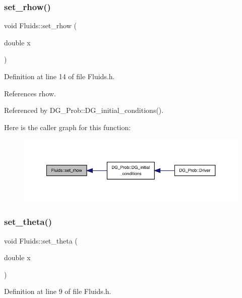 \subsubsection{\texorpdfstring{set\+\_\+rhow()}{set\_rhow()}}
{\footnotesize\ttfamily void Fluids\+::set\+\_\+rhow (\begin{DoxyParamCaption}\item[{double}]{x }\end{DoxyParamCaption})\hspace{0.3cm}{\ttfamily [inline]}}



Definition at line 14 of file Fluids.\+h.



References rhow.



Referenced by D\+G\+\_\+\+Prob\+::\+D\+G\+\_\+initial\+\_\+conditions().

Here is the caller graph for this function\+:
\nopagebreak
\begin{figure}[H]
\begin{center}
\leavevmode
\includegraphics[width=350pt]{classFluids_a5e905062ca17feb08fa1afc89efe042d_icgraph}
\end{center}
\end{figure}
\mbox{\label{classFluids_a7aa55e7d25e0bec0ffa926a9fdb19b22}} 
\subsubsection{\texorpdfstring{set\+\_\+theta()}{set\_theta()}}
{\footnotesize\ttfamily void Fluids\+::set\+\_\+theta (\begin{DoxyParamCaption}\item[{double}]{x }\end{DoxyParamCaption})\hspace{0.3cm}{\ttfamily [inline]}}



Definition at line 9 of file Fluids.\+h.



